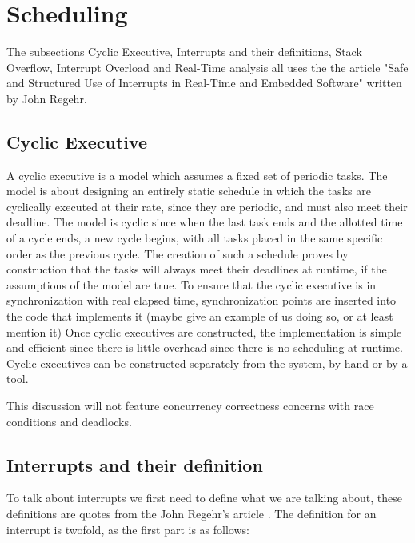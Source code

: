 \section{Scheduling}
\label{sec:Scheduling}
The subsections Cyclic Executive, Interrupts and their definitions, Stack Overflow, Interrupt Overload and Real-Time analysis all uses the the article "Safe and Structured Use of Interrupts in Real-Time and
Embedded Software" written by John Regehr. \citep{safe}


\subsection{Cyclic Executive}
\label{sec:Cyclic Executive}
A cyclic executive is a model which assumes a fixed set of periodic tasks. The model is about designing an entirely static schedule in which the tasks are cyclically executed at their rate, since they are periodic, and must also meet their deadline. The model is cyclic since when the last task ends and the allotted time of a cycle ends, a new cycle begins, with all tasks placed in the same specific order as the previous cycle. The creation of such a schedule proves by construction that the tasks will always meet their deadlines at runtime, if the assumptions of the model are true. \newline
To ensure that the cyclic executive is in synchronization with real elapsed time, synchronization points are inserted into the code that implements it (maybe give an example of us doing so, or at least mention it)
Once cyclic executives are constructed, the implementation is simple and efficient since there is little overhead since there is no scheduling at runtime. Cyclic executives can be constructed separately from the system, by hand or by a tool.

This discussion will not feature concurrency correctness concerns with race conditions and deadlocks.

\subsection{Interrupts and their definition}
\label{sec:Interrupts and their definition}
To talk about interrupts we first need to define what we are talking about, these definitions are quotes from the John Regehr's article \citep{safe}. The definition for an interrupt is twofold, as the first part is as follows:

